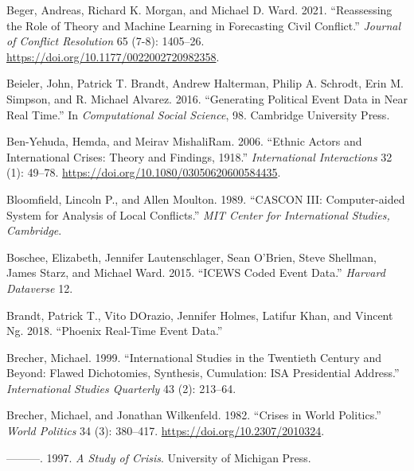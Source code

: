 \documentclass{article}
\newlength{\cslhangindent}
\newlength{\cslentryspacingunit} %
\newenvironment{CSLReferences}[2] %
 {%
  \setlength{\parindent}{0pt}
  \ifodd #1
  \let\oldpar\par
  \def\par{\hangindent=\cslhangindent\oldpar}
  \fi
  \setlength{\parskip}{#2\cslentryspacingunit}
 }%
 {}
\begin{document}
\begin{CSLReferences}{1}{0}
\leavevmode{}%
Beger, Andreas, Richard K. Morgan, and Michael D. Ward. 2021.
{``Reassessing the {Role} of {Theory} and {Machine Learning} in
{Forecasting Civil Conflict}.''} \emph{Journal of Conflict Resolution}
65 (7-8): 1405--26. \url{https://doi.org/10.1177/0022002720982358}.

\leavevmode{}%
Beieler, John, Patrick T. Brandt, Andrew Halterman, Philip A. Schrodt,
Erin M. Simpson, and R. Michael Alvarez. 2016. {``Generating Political
Event Data in Near Real Time.''} In \emph{Computational Social Science},
98. {Cambridge University Press}.

\leavevmode{}%
Ben-Yehuda, Hemda, and Meirav MishaliRam. 2006. {``Ethnic {Actors} and
{International Crises}: {Theory} and {Findings},
1918.''} \emph{International Interactions} 32 (1):
49--78. \url{https://doi.org/10.1080/03050620600584435}.

\leavevmode{}%
Bloomfield, Lincoln P., and Allen Moulton. 1989. {``{CASCON III}:
{Computer-aided} System for Analysis of Local Conflicts.''} \emph{MIT
Center for International Studies, Cambridge}.

\leavevmode{}%
Boschee, Elizabeth, Jennifer Lautenschlager, Sean O'Brien, Steve
Shellman, James Starz, and Michael Ward. 2015. {``{ICEWS} Coded Event
Data.''} \emph{Harvard Dataverse} 12.

\leavevmode{}%
Brandt, Patrick T., Vito DOrazio, Jennifer Holmes, Latifur Khan, and
Vincent Ng. 2018. {``Phoenix {Real-Time Event Data}.''}

\leavevmode{}%
Brecher, Michael. 1999. {``International Studies in the Twentieth
Century and Beyond: {Flawed} Dichotomies, Synthesis, Cumulation: {ISA}
Presidential Address.''} \emph{International Studies Quarterly} 43 (2):
213--64.

\leavevmode{}%
Brecher, Michael, and Jonathan Wilkenfeld. 1982. {``Crises in {World
Politics}.''} \emph{World Politics} 34 (3): 380--417.
\url{https://doi.org/10.2307/2010324}.

\leavevmode{}%
---------. 1997. \emph{A {Study} of {Crisis}}. {University of Michigan
Press}.


\end{CSLReferences}
\end{document}
